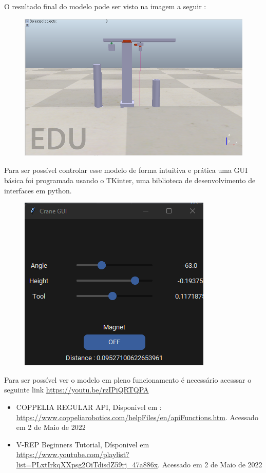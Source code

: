 \documentclass{article}
\begin{document}

            O resultado final do modelo pode ser visto na imagem a seguir : 

                \begin{figure}[h]
                    \centering
                    \includegraphics[scale = .4]{images/Model.png}
                \end{figure}

            Para ser possível controlar esse modelo de forma intuitiva e prática uma GUI básica foi programada usando o TKinter, uma biblioteca de desenvolvimento de 
            interfaces em python.

                \begin{figure}[h]
                    \centering
                    \includegraphics[scale = .4]{images/GUI.png}
                \end{figure}

            Para ser possível ver o modelo em pleno funcionamento é necessário acesssar o seguinte link \url{https://youtu.be/rzIPiQRTQPA}


\begin{itemize}
    \item COPPELIA REGULAR API, Dísponivel em : \url{https://www.coppeliarobotics.com/helpFiles/en/apiFunctions.htm}. Acessado em 2 de Maio de 2022
    \item V-REP Beginners Tutorial, Dísponivel em \url{https://www.youtube.com/playlist?list=PLxtIrkqXXpsg2OiTdisdZ59rj_47a886x}. Acessado em 2 de Maio de 2022
\end{itemize}
\end{document}
